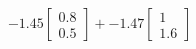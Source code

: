\documentclass[preview]{standalone}
\begin{document}
\begin{align*}
-1.45 \begin{bmatrix} 0.8 \\ 0.5 \end{bmatrix} + -1.47 \begin{bmatrix} 1 \\ 1.6 \end{bmatrix}
\end{align*}
\end{document}

